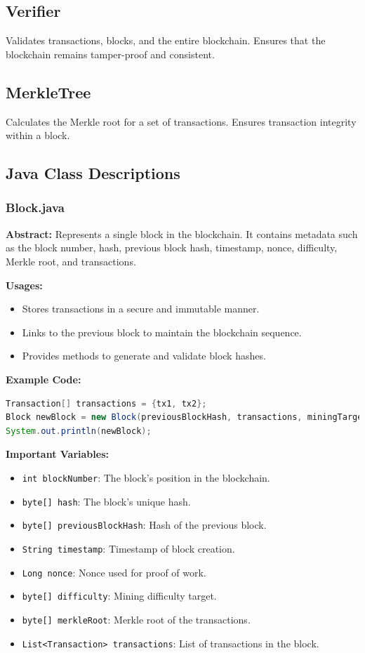 \documentclass[12pt]{article}
\begin{document}
\subsection{Verifier}
Validates transactions, blocks, and the entire blockchain. Ensures that the blockchain remains tamper-proof and consistent.

\subsection{MerkleTree}
Calculates the Merkle root for a set of transactions. Ensures transaction integrity within a block.

\subsection{Java Class Descriptions}

\subsubsection{Block.java}
\textbf{Abstract:} Represents a single block in the blockchain. It contains metadata such as the block number, hash, previous block hash, timestamp, nonce, difficulty, Merkle root, and transactions.

\textbf{Usages:}
\begin{itemize}
    \item Stores transactions in a secure and immutable manner.
    \item Links to the previous block to maintain the blockchain sequence.
    \item Provides methods to generate and validate block hashes.
\end{itemize}

\textbf{Example Code:}
\begin{lstlisting}[language=Java]
Transaction[] transactions = {tx1, tx2};
Block newBlock = new Block(previousBlockHash, transactions, miningTargetValue);
System.out.println(newBlock);
\end{lstlisting}

\textbf{Important Variables:}
\begin{itemize}
    \item \texttt{int blockNumber}: The block's position in the blockchain.
    \item \texttt{byte[] hash}: The block's unique hash.
    \item \texttt{byte[] previousBlockHash}: Hash of the previous block.
    \item \texttt{String timestamp}: Timestamp of block creation.
    \item \texttt{Long nonce}: Nonce used for proof of work.
    \item \texttt{byte[] difficulty}: Mining difficulty target.
    \item \texttt{byte[] merkleRoot}: Merkle root of the transactions.
    \item \texttt{List<Transaction> transactions}: List of transactions in the block.
\end{itemize}
\end{document}
